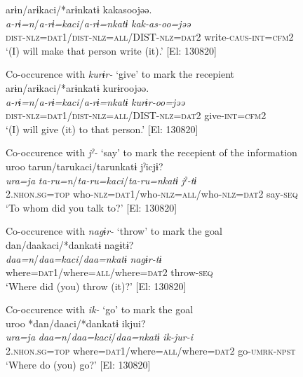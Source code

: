 {\TM}
\glll arɨn/arɨkaci/*arɨnkatɨ  kakasoojəə.\\
\textit{a-rɨ=n}/\textit{a-rɨ=kaci}/\textit{a-rɨ=nkatɨ}  \textit{kak-as-oo=jəə}\\
    \textsc{dist}-\textsc{nlz}=\textsc{dat}1/\textsc{dist}-\textsc{nlz}=\textsc{all}/DIST-\textsc{nlz}=\textsc{dat2}  write-\textsc{caus}-\textsc{int}=\textsc{cfm}2\\
\glt    ‘(I) will make that person write (it).’ [El: 130820]

\ex Co-occurence with \textit{kurɨr-} ‘give’ to mark the recepient\\

{\TM}
\glll arɨn/arɨkaci/*arɨnkatɨ  kurɨroojəə.\\
\textit{a-rɨ=n}/\textit{a-rɨ=kaci}/\textit{a-rɨ=nkatɨ}  \textit{kurɨr-oo=jəə}\\
    \textsc{dist}-\textsc{nlz}=\textsc{dat}1/\textsc{dist}-\textsc{nlz}=\textsc{all}/DIST-\textsc{nlz}=\textsc{dat2}  give-\textsc{int}=\textsc{cfm}2\\
\glt    ‘(I) will give (it) to that person.’ [El: 130820]

\ex Co-occurence with \textit{jˀ-} ‘say’ to mark the recepient of the information\\

{\TM}
\glll uroo  tarun/tarukaci/tarunkatɨ  jˀicjɨ?\\
\textit{ura=ja}  \textit{ta-ru=n}/\textit{ta-ru=kaci}/\textit{ta-ru=nkatɨ}  \textit{jˀ-tɨ}\\
    2.\textsc{nhon}.\textsc{sg}=\textsc{top}  who-\textsc{nlz}=\textsc{dat}1/who-\textsc{nlz}=\textsc{all}/who-\textsc{nlz}=\textsc{dat2}  say-\textsc{seq}\\
\glt    ‘To whom did you talk to?’ [El: 130820]

\ex Co-occurence with \textit{nagɨr-} ‘throw’ to mark the goal\\

{\TM}
\glll *dan/daakaci/*dankatɨ  nagɨtɨ?\\
\textit{daa=n}/\textit{daa=kaci}/\textit{daa=nkatɨ}  \textit{nagɨr-tɨ}\\
     where=\textsc{dat}1/where=\textsc{all}/where=\textsc{dat2}  throw-\textsc{seq}\\
 \glt    ‘Where did (you) throw (it)?’ [El: 130820]

\ex Co-occurence with \textit{ik-} ‘go’ to mark the goal\\

{\TM}
\glll uroo  *dan/daaci/*dankatɨ  ikjui?\\
\textit{ura=ja}  \textit{daa=n}/\textit{daa=kaci}/\textit{daa=nkatɨ}  \textit{ik-jur-i}\\
    2.\textsc{nhon}.\textsc{sg}=\textsc{top}  where=\textsc{dat}1/where=\textsc{all}/where=\textsc{dat2}  go-\textsc{umrk}-\textsc{npst}\\
 \glt    ‘Where do (you) go?’ [El: 130820]
\z
\z

